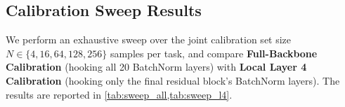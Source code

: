 \documentclass{article}
\begin{document}
\subsection{Calibration Sweep Results}
We perform an exhaustive sweep over the joint calibration set size $N \in \{4, 16, 64, 128, 256\}$ samples per task, and compare \textbf{Full-Backbone Calibration} (hooking all 20 BatchNorm layers) with \textbf{Local Layer 4 Calibration} (hooking only the final residual block's BatchNorm layers). The results are reported in \cref{tab:sweep_all,tab:sweep_l4}.

\begin{table}[h]
\caption{\textbf{Full-Backbone Calibration Sweep}: Multi-task model merging accuracies (\%) on ResNet-18 across varying calibration sample budgets $N$ per task when calibrating all 20 BatchNorm layers.}
\label{tab:sweep_all}
\begin{center}
\begin{small}
\end{small}
\end{center}
\end{table}
\end{document}
